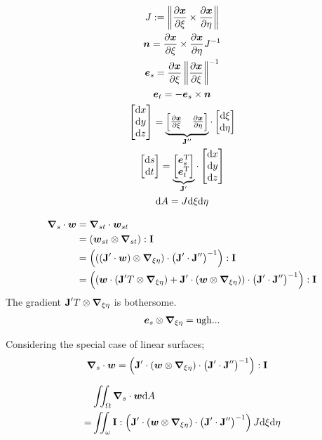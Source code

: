 \documentclass[a4paper,11pt]{article}
\renewcommand{\to}[1]{\text{\boldmath $#1$}} %
\newcommand{\ts}[1]{\text{\boldmath $\mathrm{#1}$}} %
\newcommand{\intd}[1]{\mathrm{d}#1}
\newcommand{\pderiv}[2]{\frac{\partial#1}{\partial#2}}
\newcommand{\norm}[1]{\left\lVert{#1}\right\rVert}
\newcommand{\T}{\mathrm{T}}
\newcommand{\defeq}{:=}
\begin{document}
\begin{gather}
 J \defeq \norm{\pderiv{\to x}{\xi} \times  \pderiv{\to x}{\eta}}\\
 \to n = \pderiv{\to x}{\xi} \times \pderiv{\to x}{\eta} J^{-1}\\
 \to e_s = \pderiv{\to x}{\xi}\norm{\pderiv{\to x}{\xi}}^{-1}\\
 \to e_t = -\to e_s\times \to n\\
 \begin{bmatrix}\intd x\\ \intd y\\ \intd z\end{bmatrix} =
  \underbrace{\begin{bmatrix}\pderiv{\to x}{\xi} & \pderiv{\to x}{\eta}
  \end{bmatrix}}_{\ts J''}
  \cdot \begin{bmatrix}\intd \xi \\ \intd \eta\end{bmatrix}\\
 \begin{bmatrix}\intd s\\ \intd t\end{bmatrix} =
  \underbrace{\begin{bmatrix} \to e_s^\T \\ \to e_t^\T
  \end{bmatrix}}_{\ts J'}
  \cdot \begin{bmatrix}\intd x \\ \intd y \\ \intd z\end{bmatrix}\\
 \intd A = J \intd \xi \intd \eta
\end{gather}

\begin{align}
 \to\nabla_s\cdot\to w &= \to\nabla_{st}\cdot\to w_{st} \\
 &= (\to w_{st}\otimes\to\nabla_{st}):\ts I \\
 &= \left(((\ts J'\cdot \to w) \otimes \to\nabla_{\xi\eta})\cdot \left(\ts J'\cdot\ts J''\right)^{-1}\right): \ts I\\
 &= \left((\to w\cdot (\ts J'^\T \otimes \to\nabla_{\xi\eta}) +\ts J'\cdot(\to w\otimes\to\nabla_{\xi\eta}) )\cdot \left(\ts J'\cdot\ts J''\right)^{-1}\right): \ts I
\end{align}
The gradient $\ts J'^\T \otimes\to\nabla_{\xi\eta}$ is bothersome.
\begin{align}
 \to e_s \otimes \to\nabla_{\xi\eta} = \text{ugh...}
\end{align}

Considering the special case of linear surfaces;
\begin{align}
  \to\nabla_s\cdot\to w &= \left(\ts J'\cdot(\to w\otimes\to\nabla_{\xi\eta})\cdot \left(\ts J'\cdot\ts J''\right)^{-1}\right): \ts I
\end{align}

\begin{align}
 &\iint_\Omega\to \nabla_s\cdot\to w\intd A\\
=&\iint_\omega \ts I:\left(\ts J'\cdot(\to w\otimes\to\nabla_{\xi\eta})\cdot \left(\ts J'\cdot\ts J''\right)^{-1}\right)J\intd\xi\intd\eta
\end{align}
\end{document}
